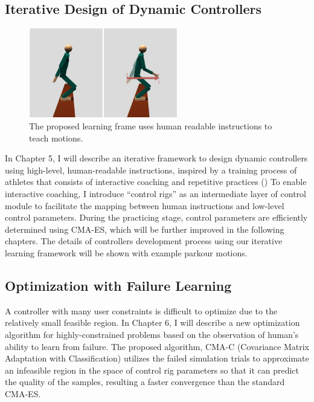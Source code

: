 \subsection{Iterative Design of Dynamic Controllers}
\begin{figure}
 \vspace{-10pt}
  \begin{center}
    \includegraphics[width=0.58\textwidth]{images/intro_teach.png}
  \end{center}
   \vspace{-25pt}
  \caption{The proposed learning frame uses human readable instructions
    to teach motions.}
  \label{fig:intro_teach}
   \vspace{-10pt}
\end{figure}
In Chapter 5, I will describe an iterative framework to design dynamic
controllers using high-level, human-readable instructions,
inspired by a training process of athletes that consists of
interactive coaching and repetitive practices ()
To enable interactive coaching, I introduce ``control rigs'' as
an intermediate layer of control module to facilitate the mapping between
human instructions and low-level control parameters.
During the practicing stage, control parameters are efficiently determined
using CMA-ES, which will be further improved in the following chapters.
The details of controllers development process using our iterative learning
framework will be shown with example parkour motions.

\subsection{Optimization with Failure Learning}
A controller with many user constraints is difficult to optimize due to the
relatively small feasible region.
In Chapter 6, I will describe a new optimization algorithm for
highly-constrained problems based on the observation of human’s ability 
to learn from failure.
The proposed algorithm, CMA-C (Covariance Matrix Adaptation with
Classification) utilizes the failed simulation trials to approximate 
an infeasible region in the space of control rig parameters 
so that it can predict the quality of the samples,
resulting a faster convergence than the standard CMA-ES.


